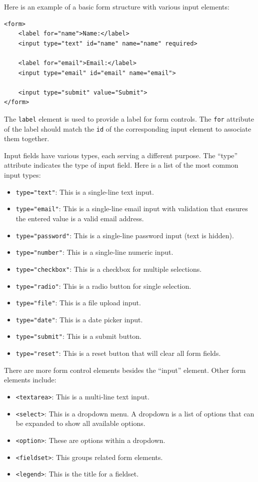 Here is an example of a basic form structure with various input elements:

\begin{verbatim}
<form>
    <label for="name">Name:</label>
    <input type="text" id="name" name="name" required>

    <label for="email">Email:</label>
    <input type="email" id="email" name="email">

    <input type="submit" value="Submit">
</form>
\end{verbatim}

The \verb|label| element is used to provide a label for form controls. 
The \verb|for| attribute of the label should match the \verb|id| of the corresponding input element to associate them together. 

Input fields have various types, each serving a different purpose. The ``type'' attribute indicates the type of input field. 
Here is a list of the most common input types:

\begin{itemize}
    \item \verb|type="text"|: This is a single-line text input.
    \item \verb|type="email"|: This is a single-line email input with validation that ensures the entered value is a valid email address.
    \item \verb|type="password"|: This is a single-line password input (text is hidden).
    \item \verb|type="number"|: This is a single-line numeric input.
    \item \verb|type="checkbox"|: This is a checkbox for multiple selections.
    \item \verb|type="radio"|: This is a radio button for single selection.
    \item \verb|type="file"|: This is a file upload input.
    \item \verb|type="date"|: This is a date picker input.
    \item \verb|type="submit"|: This is a submit button.
    \item \verb|type="reset"|: This is a reset button that will clear all form fields.
\end{itemize}

There are more form control elements besides the ``input'' element. Other form elements include:

\begin{itemize}
    \item \verb|<textarea>|: This is a multi-line text input.
    \item \verb|<select>|: This is a dropdown menu. A dropdown is a list of options that can be expanded to show all available options.
    \item \verb|<option>|: These are options within a dropdown.
    \item \verb|<fieldset>|: This groups related form elements.
    \item \verb|<legend>|: This is the title for a fieldset.
\end{itemize}

